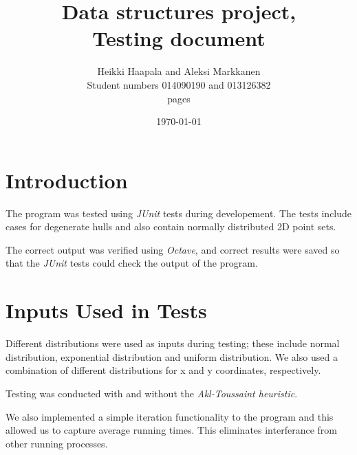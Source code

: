 \documentclass[a4paper,12pt,leqno,titlepage]{article}
\begin{document}
\begin{titlepage}
\title{Data structures project, \\
Testing document}
\author{Heikki Haapala and Aleksi Markkanen\\
Student numbers 014090190 and 013126382\\
\pageref{LastPage} pages}
\date{\today}
\end{titlepage}
\maketitle
\pagebreak
\tableofcontents
\pagebreak

\section{Introduction}
The program was tested using \emph{JUnit} tests during developement.
The tests include cases for degenerate hulls and also contain normally distributed 2D point sets.

The correct output was verified using \emph{Octave}, and correct results were saved so that the \emph{JUnit} tests could check the output of the program.


\pagebreak
\section{Inputs Used in Tests}
Different distributions were used as inputs during testing; these include normal distribution, exponential distribution and uniform distribution. We also used a combination of different distributions for x and y coordinates, respectively.

Testing was conducted with and without the \emph{Akl-Toussaint heuristic}.

We also implemented a simple iteration functionality to the program and this allowed us to capture average running times.
This eliminates interferance from other running processes.

\pagebreak
\end{document}
